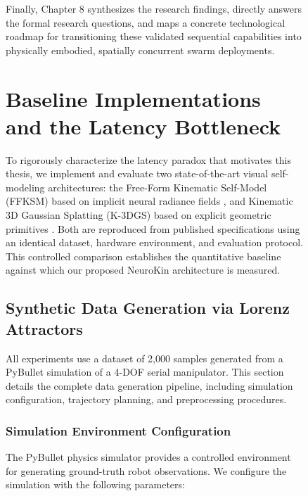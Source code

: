 \documentclass[12pt,a4paper,oneside]{report}
\begin{document}
\begin{figure}[H]
Finally, Chapter 8 synthesizes the research findings, directly answers the formal research questions, and maps a concrete technological roadmap for transitioning these validated sequential capabilities into physically embodied, spatially concurrent swarm deployments.
\clearpage

\chapter{Baseline Implementations and the Latency Bottleneck}
\label{chap:baseline_latency_bottleneck_ch3}

To rigorously characterize the latency paradox that motivates this thesis, we implement and evaluate two state-of-the-art visual self-modeling architectures: the Free-Form Kinematic Self-Model (FFKSM) based on implicit neural radiance fields \cite{hu2024teaching}, and Kinematic 3D Gaussian Splatting (K-3DGS) based on explicit geometric primitives \cite{hu2025learning}. Both are reproduced from published specifications using an identical dataset, hardware environment, and evaluation protocol. This controlled comparison establishes the quantitative baseline against which our proposed NeuroKin architecture is measured.

\section{Synthetic Data Generation via Lorenz Attractors}

All experiments use a dataset of 2,000 samples generated from a PyBullet simulation of a 4-DOF serial manipulator. This section details the complete data generation pipeline, including simulation configuration, trajectory planning, and preprocessing procedures.

\subsection{Simulation Environment Configuration}

The PyBullet physics simulator provides a controlled environment for generating ground-truth robot observations. We configure the simulation with the following parameters:


\end{figure}
\end{document}
